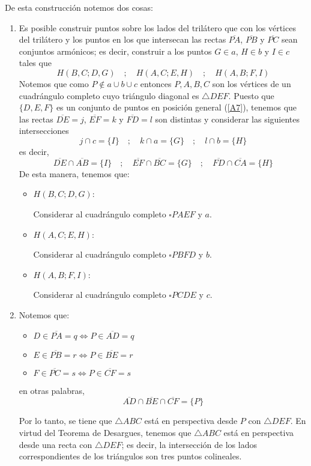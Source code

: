 \documentclass[12pt]{book}
\theoremstyle{definition}
\begin{document}
De esta construcción notemos dos cosas:
\begin{enumerate}
\item\label{lineal1} Es posible construir puntos sobre los lados del trilátero que con los vértices del trilátero y los puntos en los que intersecan las rectas $\overline{PA}$, $\overline{PB}$ y $\overline{PC}$ sean conjuntos armónicos; es decir, construir a los puntos $G \in a$, $H \in b$ y $I \in c$ tales que
$$H(B,C;D,G) \quad ; \quad H(A,C;E,H) \quad ; \quad H(A,B;F,I)$$
Notemos que como $P\notin  a \cup b \cup c$ entonces $P, A, B, C$ son los vértices de un cuadrángulo completo cuyo triángulo diagonal es $\triangle DEF$. Puesto que $\{D,E,F\}$ es un conjunto de puntos en posición general (\ref{A7}), tenemos que las rectas $\overline{DE}=j$, $\overline{EF}=k$ y $\overline{FD}=l$ son distintas y considerar las siguientes intersecciones
$$j \cap c= \{I\} \quad ; \quad k \cap a = \{G\} \quad ; \quad l \cap b = \{H\}$$
es decir, 
$$\overline{DE} \cap \overline{AB} = \{I\} \quad ; \quad \overline{EF} \cap \overline{BC} = \{G\} \quad ; \quad \overline{FD} \cap \overline{CA} = \{H\}$$
De esta manera, tenemos que:
\begin{itemize}
\item $H(B,C;D,G)$:

Considerar al cuadrángulo completo $\square PAEF$ y $a$.

\item $H(A,C;E,H)$:

Considerar al cuadrángulo completo $\square PBFD$ y $b$.

\item $H(A,B;F,I)$:

Considerar al cuadrángulo completo $\square PCDE$ y $c$.
\end{itemize}

\item\label{lineal2} Notemos que:
\begin{itemize}
\item $D \in \overline{PA} = q \Leftrightarrow P \in \overline{AD} = q$
\item $E \in \overline{PB} = r  \Leftrightarrow P \in \overline{BE} = r$
\item $F \in \overline{PC} = s \Leftrightarrow P \in \overline{CF} = s$
\end{itemize}
en otras palabras,
$$\overline{AD} \cap \overline{BE} \cap \overline{CF} = \{P\}$$

Por lo tanto, se tiene que $\triangle ABC$ está en perspectiva desde $P$ con $\triangle DEF$. En virtud del Teorema de Desargues, tenemos que $\triangle ABC$ está en perspectiva desde una recta con $\triangle DEF$; es decir, la intersección de los lados correspondientes de los triángulos son tres puntos colineales.
\end{enumerate}
\end{document}
